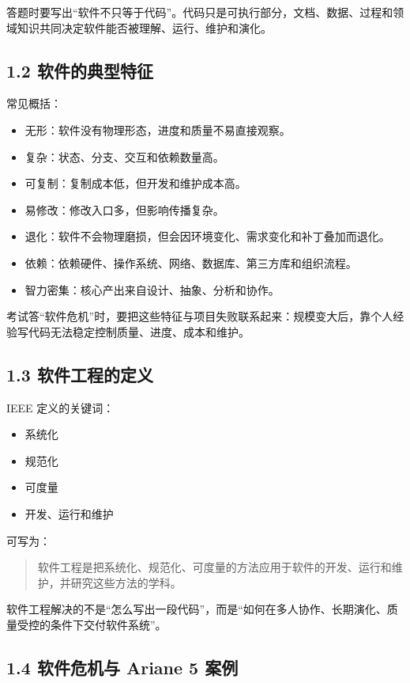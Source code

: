 \documentclass[UTF8,zihao=-4]{ctexart}
\begin{document}
答题时要写出“软件不只等于代码”。代码只是可执行部分，文档、数据、过程和领域知识共同决定软件能否被理解、运行、维护和演化。

\subsection{1.2 软件的典型特征}

常见概括：

\begin{itemize}
\item 无形：软件没有物理形态，进度和质量不易直接观察。
\item 复杂：状态、分支、交互和依赖数量高。
\item 可复制：复制成本低，但开发和维护成本高。
\item 易修改：修改入口多，但影响传播复杂。
\item 退化：软件不会物理磨损，但会因环境变化、需求变化和补丁叠加而退化。
\item 依赖：依赖硬件、操作系统、网络、数据库、第三方库和组织流程。
\item 智力密集：核心产出来自设计、抽象、分析和协作。
\end{itemize}

考试答“软件危机”时，要把这些特征与项目失败联系起来：规模变大后，靠个人经验写代码无法稳定控制质量、进度、成本和维护。

\subsection{1.3 软件工程的定义}

IEEE 定义的关键词：

\begin{itemize}
\item 系统化
\item 规范化
\item 可度量
\item 开发、运行和维护
\end{itemize}

可写为：

\begin{quote}
软件工程是把系统化、规范化、可度量的方法应用于软件的开发、运行和维护，并研究这些方法的学科。
\end{quote}

软件工程解决的不是“怎么写出一段代码”，而是“如何在多人协作、长期演化、质量受控的条件下交付软件系统”。

\subsection{1.4 软件危机与 Ariane 5 案例}
\end{document}
